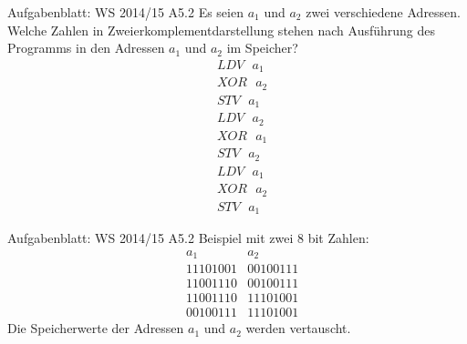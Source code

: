 \begin{frame}{Aufgabenblatt: WS 2014/15 A5.2}
  Es seien $a_1$ und $a_2$ zwei verschiedene Adressen. Welche Zahlen in Zweierkomplementdarstellung stehen nach Ausführung des Programms in den Adressen $a_1$ und $a_2$ im Speicher?
  \begin{align*}
    &LDV\text{ }a_1 \\
    &XOR\text{ }a_2\\
    &STV\text{ }a_1\\
    &LDV\text{ }a_2\\
    &XOR\text{ }a_1\\
    &STV\text{ }a_2\\
    &LDV\text{ }a_1\\
    &XOR\text{ }a_2\\
    &STV\text{ }a_1
  \end{align*}
\end{frame}

\begin{frame}{Aufgabenblatt: WS 2014/15 A5.2}
  Beispiel mit zwei 8 bit Zahlen:
  \begin{align*}
    &a_1 &a_2\\
    &11101001 &00100111\\
    &11001110 &00100111\\
    &11001110 &11101001\\
    &00100111 &11101001
  \end{align*}
  \pause
  Die Speicherwerte der Adressen $a_1$ und $a_2$ werden vertauscht.
\end{frame}
